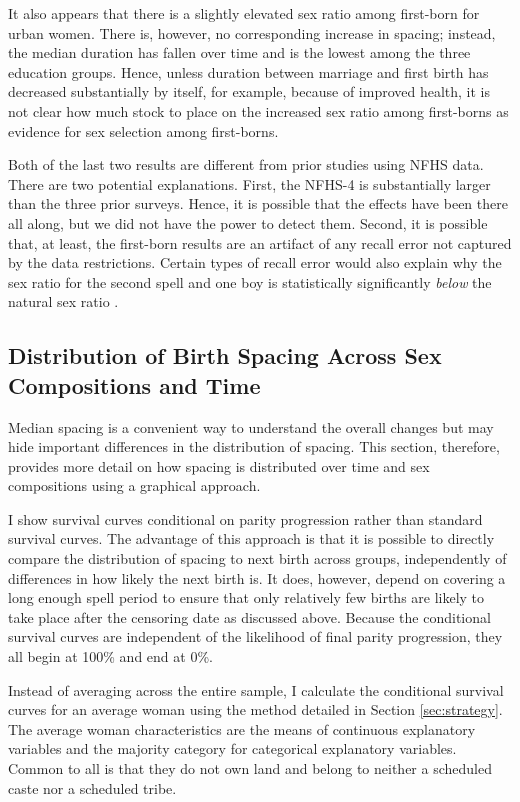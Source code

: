 \documentclass[12pt,letterpaper]{article}
\begin{document}
It also appears that there is a slightly elevated sex ratio among 
first-born for urban women. 
There is, however, no corresponding increase in spacing; instead,
the median duration has fallen over time and is the lowest among
the three education groups.
Hence, unless duration between marriage and first birth has decreased 
substantially by itself, for example, because of improved health, it
is not clear how much stock to place on the increased sex ratio
among first-borns as evidence for sex selection among first-borns.

Both of the last two results are different from prior studies using NFHS data.
There are two potential explanations.
First, the NFHS-4 is substantially larger than the three prior surveys.
Hence, it is possible that the effects have been there all along, but 
we did not have the power to detect them.
Second, it is possible that, at least, the first-born results are an
artifact of any recall error not captured by the data restrictions.
Certain types of recall error would also explain why the sex ratio for
the second spell and one boy is statistically significantly \emph{below} 
the natural sex ratio \citep{Portner2018b}.


\subsection{Distribution of Birth Spacing Across Sex Compositions and Time}

Median spacing is a convenient way to understand the overall changes but
may hide important differences in the distribution of spacing.
This section, therefore, provides more detail on how spacing is distributed
over time and sex compositions using a graphical approach.

I show survival curves conditional on parity progression rather than
standard survival curves. 
The advantage of this approach is that it is possible to directly compare 
the distribution of spacing to next birth across groups, independently of 
differences in how likely the next birth is.
It does, however, depend on covering a long enough spell period
to ensure that only relatively few births are likely to take place after the
censoring date as discussed above.
Because the conditional survival curves are independent of the likelihood
of final parity progression, they all begin at 100\% and end at 0\%.

Instead of averaging across the entire sample, I calculate the conditional
survival curves for an average woman using the method detailed in 
Section \ref{sec:strategy}.
The average woman characteristics are the means of continuous explanatory 
variables and the majority category for categorical explanatory variables.
Common to all is that they do not own land and belong to neither 
a scheduled caste nor a scheduled tribe.
\end{document}
